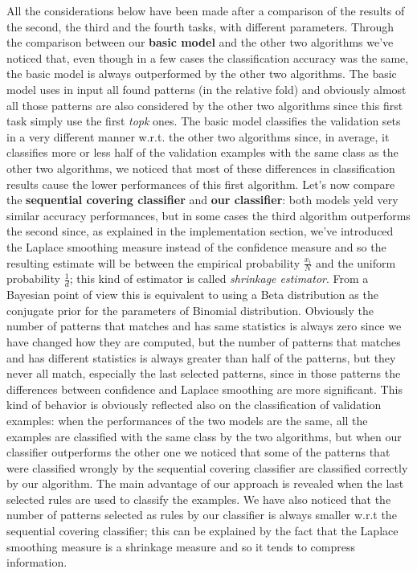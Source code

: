 \documentclass[11pt, a4paper]{article}
\begin{document}
		All the considerations below have been made after a comparison of the results of the second, the third and the fourth tasks, with different parameters. \newline
		Through the comparison between our \textbf{ basic model} and the other two algorithms we've noticed that, even though in a few cases the classification accuracy was the same, the basic model is always outperformed by the other two algorithms.
		The basic model uses in input all found patterns (in the relative fold) and obviously almost all those patterns are also considered by the other two algorithms since this first task simply use the first \textit{topk} ones. The basic model classifies the validation sets in a very different manner w.r.t. the other two algorithms since, in average, it classifies more or less half of the validation examples with the same class as the other two algorithms, we noticed that most of these differences in classification results cause the lower performances of this first algorithm.
		\newline
		Let's now compare the \textbf{sequential covering classifier} and \textbf{our classifier}:
		both models yeld very similar accuracy performances, but in some cases the third algorithm outperforms the second since, as explained in the implementation section, we've introduced the Laplace smoothing measure instead of the confidence measure and so the resulting estimate will be between the empirical probability $ \frac {x_i}{N}$ and the uniform probability $ \frac {1}{d}$;  this kind of estimator is called \textit{shrinkage estimator}.
		From a Bayesian point of view this is equivalent to using a Beta distribution as the conjugate prior for the parameters of Binomial distribution.
		Obviously the number of patterns that matches and has same statistics is always zero since we have changed how they are computed, but the number of patterns that matches and has different statistics is always greater than half of the patterns, but they never all match, especially the last selected patterns, since in those patterns the differences between confidence and Laplace smoothing are more significant. This kind of behavior is obviously reflected also on the classification of validation examples: when the performances of the two models are the same, all the examples are classified with the same class by the two algorithms, but when our classifier outperforms the other one we noticed that some of the patterns that were classified wrongly by the sequential covering classifier are classified correctly by our algorithm. The main advantage of our approach is revealed when the last selected rules are used to classify the examples.
		We have also noticed that the number of patterns selected as rules by our classifier is always smaller w.r.t the sequential covering classifier; this can be explained by the fact that the Laplace smoothing measure is a shrinkage measure and so it tends to compress information.
\end{document}
